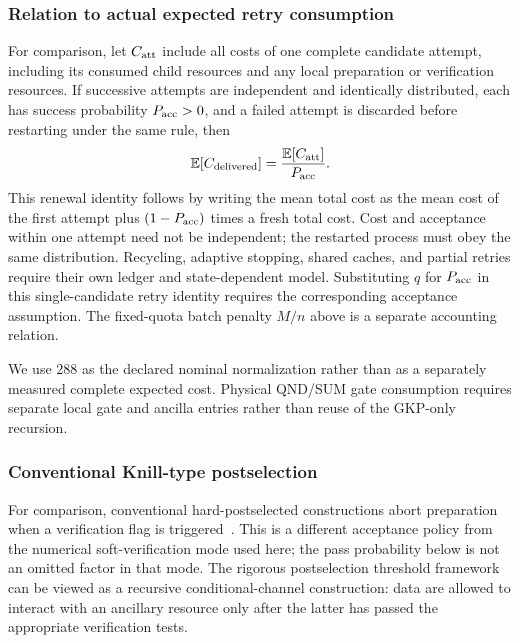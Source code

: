 \documentclass[aps,
prx,
superscriptaddress,
reprint,
longbibliography,
floatfix]{revtex4-2}
\begin{document}
\subsubsection{Relation to actual expected retry consumption}
For comparison, let $C_{\rm att}$ include all costs of one complete candidate attempt, including its consumed child resources and any local preparation or verification resources. If successive attempts are independent and identically distributed, each has success probability $P_{\rm acc}>0$, and a failed attempt is discarded before restarting under the same rule, then
\begin{equation}
\mathbb E[C_{\rm delivered}]
=\frac{\mathbb E[C_{\rm att}]}{P_{\rm acc}}.
\label{eq:actual_retry_cost}
\end{equation}
This renewal identity follows by writing the mean total cost as the mean cost of the first attempt plus $(1-P_{\rm acc})$ times a fresh total cost. Cost and acceptance within one attempt need not be independent; the restarted process must obey the same distribution. Recycling, adaptive stopping, shared caches, and partial retries require their own ledger and state-dependent model. Substituting $q$ for $P_{\rm acc}$ in this single-candidate retry identity requires the corresponding acceptance assumption. The fixed-quota batch penalty $M/n$ above is a separate accounting relation.

We use $288$ as the declared nominal normalization rather than as a separately measured complete expected cost. Physical QND/SUM gate consumption requires separate local gate and ancilla entries rather than reuse of the GKP-only recursion. 
\subsubsection{Conventional Knill-type postselection}
\label{subsec:knill_hard}

For comparison, conventional hard-postselected constructions abort preparation when a verification flag is triggered~\cite{Knill2005,AGP2008Postselection}. This is a different acceptance policy from the numerical soft-verification mode used here; the pass probability below is not an omitted factor in that mode. The rigorous postselection threshold framework can be viewed as a recursive conditional-channel construction: data are allowed to interact with an ancillary resource only after the latter has passed the appropriate verification tests.
\end{document}
